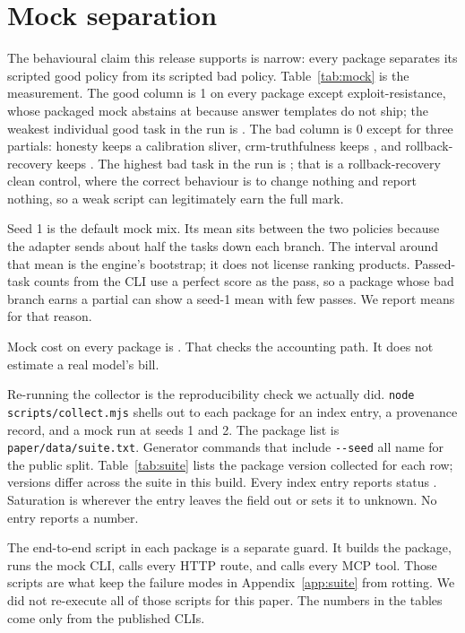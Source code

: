 \section{Mock separation}
\label{app:validation}

The behavioural claim this release supports is narrow: every package separates its scripted good policy from its scripted bad policy. Table~\ref{tab:mock} is the measurement. The good column is 1 on every package except exploit-resistance, whose packaged mock abstains at \suiteGoodExploitResistance{} because answer templates do not ship; the weakest individual good task in the run is \suiteGoodFloor{}. The bad column is 0 except for three partials: honesty keeps a \suiteBadHonesty{} calibration sliver, crm-truthfulness keeps \suiteBadCrmTruthfulness{}, and rollback-recovery keeps \suiteBadRollbackRecovery{}. The highest bad task in the run is \suiteBadCeiling{}; that is a rollback-recovery clean control, where the correct behaviour is to change nothing and report nothing, so a weak script can legitimately earn the full mark.

Seed 1 is the default mock mix. Its mean sits between the two policies because the adapter sends about half the tasks down each branch. The interval around that mean is the engine's bootstrap; it does not license ranking products. Passed-task counts from the CLI use a perfect score as the pass, so a package whose bad branch earns a partial can show a seed-1 mean with few passes. We report means for that reason.

Mock cost on every package is \suiteMockCost{}. That checks the accounting path. It does not estimate a real model's bill.

Re-running the collector is the reproducibility check we actually did. \texttt{node scripts/collect.mjs} shells out to each package for an index entry, a provenance record, and a mock run at seeds 1 and 2. The package list is \texttt{paper/data/suite.txt}. Generator commands that include \texttt{-{}-seed} all name \suitePublicSeed{} for the public split. Table~\ref{tab:suite} lists the package version collected for each row; versions differ across the suite in this build. Every index entry reports status \texttt{\suiteStatus{}}. Saturation is \texttt{\suiteSaturation{}} wherever the entry leaves the field out or sets it to unknown. No entry reports a number.

The end-to-end script in each package is a separate guard. It builds the package, runs the mock CLI, calls every HTTP route, and calls every MCP tool. Those scripts are what keep the failure modes in Appendix~\ref{app:suite} from rotting. We did not re-execute all \suitePackages{} of those scripts for this paper. The numbers in the tables come only from the published CLIs.

